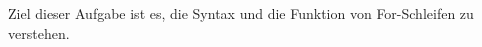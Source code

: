

Ziel dieser Aufgabe ist es, die Syntax und die Funktion von For-Schleifen zu verstehen.

\addexcercise
\addexcercise